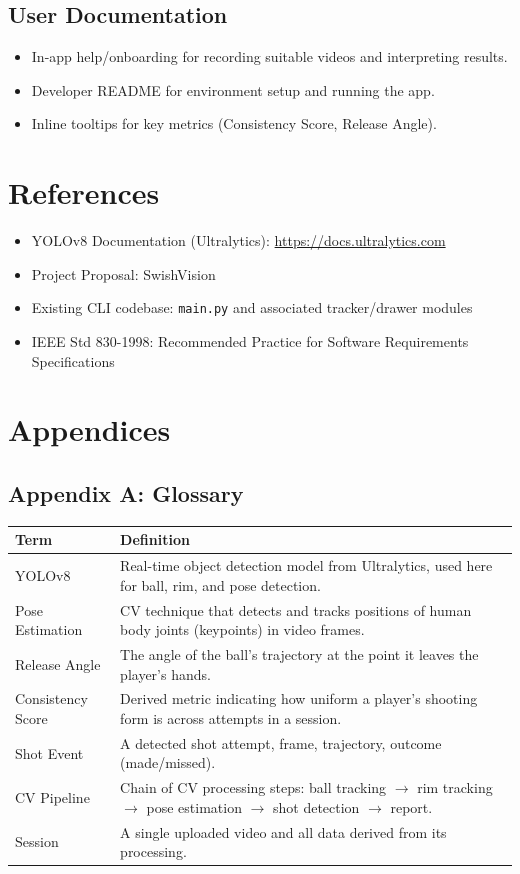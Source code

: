 ﻿\documentclass[11pt,a4paper]{article}
\begin{document}
\subsection{User Documentation}
\begin{itemize}[leftmargin=*]
    \item In-app help/onboarding for recording suitable videos and interpreting results.
    \item Developer README for environment setup and running the app.
    \item Inline tooltips for key metrics (Consistency Score, Release Angle).
\end{itemize}

\section{References}
\begin{itemize}[leftmargin=*]
    \item YOLOv8 Documentation (Ultralytics): \url{https://docs.ultralytics.com}
    \item Project Proposal: SwishVision
    \item Existing CLI codebase: \texttt{main.py} and associated tracker/drawer modules
    \item IEEE Std 830-1998: Recommended Practice for Software Requirements Specifications
\end{itemize}

\section{Appendices}

\subsection*{Appendix A: Glossary}
\begin{longtable}{|L{4cm}|L{10cm}|}
\hline
\textbf{Term} & \textbf{Definition} \\ \hline
YOLOv8 & Real-time object detection model from Ultralytics, used here for ball, rim, and pose detection. \\ \hline
Pose Estimation & CV technique that detects and tracks positions of human body joints (keypoints) in video frames. \\ \hline
Release Angle & The angle of the ball's trajectory at the point it leaves the player's hands. \\ \hline
Consistency Score & Derived metric indicating how uniform a player's shooting form is across attempts in a session. \\ \hline
Shot Event & A detected shot attempt, frame, trajectory, outcome (made/missed). \\ \hline
CV Pipeline & Chain of CV processing steps: ball tracking $\to$ rim tracking $\to$ pose estimation $\to$ shot detection $\to$ report. \\ \hline
Session & A single uploaded video and all data derived from its processing. \\ \hline
\end{longtable}
\end{document}
